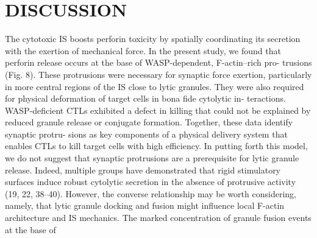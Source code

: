 \section{DISCUSSION}
The cytotoxic IS boosts perforin toxicity by spatially coordinating its secretion with the exertion of mechanical force. In the present study, we found that perforin release occurs at the base of WASP-dependent, F-actin–rich pro- trusions (Fig. 8). These protrusions were necessary for synaptic force exertion, particularly in more central regions of the IS close to lytic granules. They were also required for physical deformation of target cells in bona fide cytolytic in- teractions. WASP-deficient CTLs exhibited a defect in killing that could not be explained by reduced granule release or conjugate formation. Together, these data identify synaptic protru- sions as key components of a physical delivery system that enables CTLs to kill target cells with high efficiency. In putting forth this model, we do not suggest that synaptic protrusions are a prerequisite for lytic granule release. Indeed, multiple groups have demonstrated that rigid stimulatory surfaces induce robust cytolytic secretion in the absence of protrusive activity (19, 22, 38–40). However, the converse relationship may be worth considering, namely, that lytic granule docking and fusion might influence local F-actin architecture and IS mechanics.
The marked concentration of granule fusion events at the base of
